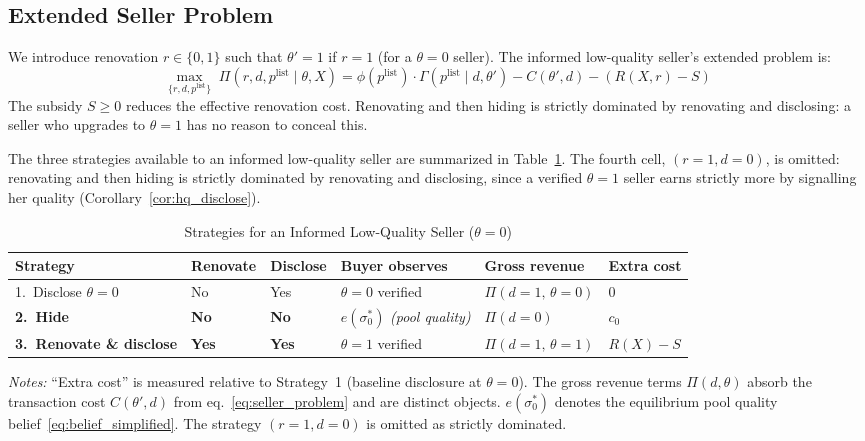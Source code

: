 \documentclass[10pt,letterpaper]{bp-template-concise}
\begin{document}
\subsection{Extended Seller Problem}

We introduce renovation $r\in\{0,1\}$ such that $\theta'=1$ if $r=1$ (for a $\theta=0$ seller). The informed low-quality seller's extended problem is:
\begin{equation}
    \max_{\{r,d,p^{\text{list}}\}}\;\Pi(r,d,p^{\text{list}}\mid\theta,X) = \phi(p^{\text{list}})\cdot\Gamma(p^{\text{list}}\mid d,\theta')-C(\theta',d)-(R(X,r)-S)
    \label{eq:seller_problem}
\end{equation}
The subsidy $S\geq 0$ reduces the effective renovation cost. Renovating and then hiding is strictly dominated by renovating and disclosing: a seller who upgrades to $\theta=1$ has no reason to conceal this.

The three strategies available to an informed low-quality seller are summarized in
Table~\ref{tab:strategies}. The fourth cell, $(r=1, d=0)$, is omitted: renovating
and then hiding is strictly dominated by renovating and disclosing, since a verified
$\theta=1$ seller earns strictly more by signalling her quality (Corollary~\ref{cor:hq_disclose}).

\begin{table}[H]
\centering
\caption{Strategies for an Informed Low-Quality Seller ($\theta=0$)}
\label{tab:strategies}
\small
\renewcommand{\arraystretch}{1.4}
\begin{tabular}{llllll}
\toprule\toprule
\textbf{Strategy} & \textbf{Renovate} & \textbf{Disclose}
    & \textbf{Buyer observes} & \textbf{Gross revenue} & \textbf{Extra cost} \\
\midrule
1.\ Disclose $\theta=0$
    & No & Yes & $\theta=0$ verified
    & $\Pi(d=1,\,\theta=0)$ & $0$ \\[3pt]
\textbf{2.\ Hide}
    & \textbf{No} & \textbf{No} & $e(\sigma_0^*)$ \emph{(pool quality)}
    & $\Pi(d=0)$ & $c_0$ \\[3pt]
\textbf{3.\ Renovate \& disclose}
    & \textbf{Yes} & \textbf{Yes} & $\theta=1$ verified
    & $\Pi(d=1,\,\theta=1)$ & $R(X)-S$ \\
\bottomrule\bottomrule
\end{tabular}
\vspace{0.5em}

\raggedright
\footnotesize
\textit{Notes:} ``Extra cost'' is measured relative to Strategy~1 (baseline disclosure
at $\theta=0$). The gross revenue terms $\Pi(d,\theta)$ absorb the transaction cost
$C(\theta',d)$ from eq.~\eqref{eq:seller_problem} and are distinct objects.
$e(\sigma_0^*)$ denotes the equilibrium pool quality belief~\eqref{eq:belief_simplified}.
The strategy $(r=1, d=0)$ is omitted as strictly dominated.\footnotemark
\end{table}
\end{document}
